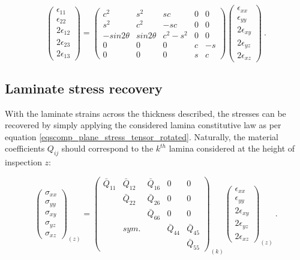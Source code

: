 \begin{equation} 
\begin{pmatrix}
\epsilon_{11} \\
\epsilon_{22} \\
2\epsilon_{12}\\
2\epsilon_{23} \\
2\epsilon_{13}
\end{pmatrix}
 =
\begin{pmatrix}
c^2 & s^2 & sc & 0 & 0 \\
s^2 & c^2 & -sc & 0 & 0 \\
-sin2\theta & sin2\theta & c^2 - s^2 & 0 & 0 \\
0 & 0 & 0 & c & -s \\
0 & 0 & 0 & s & c
\end{pmatrix}
\begin{pmatrix}
\epsilon_{xx} \\
\epsilon_{yy} \\
2\epsilon_{xy}\\
2\epsilon_{yz} \\
2\epsilon_{xz}
\end{pmatrix}
\label{eqscomp_strain_recovery7}\ .
\end{equation}

\subsection{Laminate stress recovery}

With the laminate strains across the thickness described, the stresses can be recovered by simply applying the considered lamina constitutive law as per equation \ref{eqscomp_plane_stress_tensor_rotated}. Naturally, the material coefficients $Q_{ij}$ should correspond to the $k^{th}$ lamina considered at the height of inspection $z$:

\begin{equation} 
{\begin{pmatrix}
\sigma_{xx} \\
\sigma_{yy} \\
\sigma_{xy} \\
\sigma_{yz} \\
\sigma_{xz} 
\end{pmatrix}}_{(z)}
=
{\begin{pmatrix}
\bar{Q}_{11} & \bar{Q}_{12} &  \bar{Q}_{16} & 0 & 0 \\
\  & \bar{Q}_{22} &  \bar{Q}_{26} & 0 & 0 \\
\  & \  & \bar{Q}_{66}  & 0 & 0 \\
\  & sym. & \  & \bar{Q}_{44} & \bar{Q}_{45} \\
\  & \  & \  & \ & \bar{Q}_{55}
\end{pmatrix}}_{(k)}
{\begin{pmatrix}
\epsilon_{xx} \\
\epsilon_{yy} \\
2\epsilon_{xy}\\
2\epsilon_{yz} \\
2\epsilon_{xz}
\end{pmatrix}}_{(z)}
\label{eqscomp_stress_recovery1}\ .
\end{equation}

